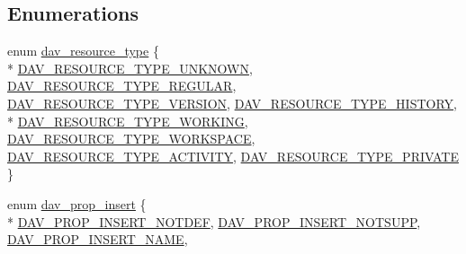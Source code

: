 \subsection*{Enumerations}
\begin{DoxyCompactItemize}
\item 
enum \hyperlink{group__MOD__DAV_gad94695b8d6724b766cfa9f5ec84c0fe2}{dav\+\_\+resource\+\_\+type} \{ \\*
\hyperlink{group__MOD__DAV_ggad94695b8d6724b766cfa9f5ec84c0fe2ac8a224d9b655ee38ad932b97f601fbf2}{D\+A\+V\+\_\+\+R\+E\+S\+O\+U\+R\+C\+E\+\_\+\+T\+Y\+P\+E\+\_\+\+U\+N\+K\+N\+O\+WN}, 
\hyperlink{group__MOD__DAV_ggad94695b8d6724b766cfa9f5ec84c0fe2a567c5375a827c1f808ac4dc5ed1e8e80}{D\+A\+V\+\_\+\+R\+E\+S\+O\+U\+R\+C\+E\+\_\+\+T\+Y\+P\+E\+\_\+\+R\+E\+G\+U\+L\+AR}, 
\hyperlink{group__MOD__DAV_ggad94695b8d6724b766cfa9f5ec84c0fe2a2af72686e7dd0b4e30019abdd5befe12}{D\+A\+V\+\_\+\+R\+E\+S\+O\+U\+R\+C\+E\+\_\+\+T\+Y\+P\+E\+\_\+\+V\+E\+R\+S\+I\+ON}, 
\hyperlink{group__MOD__DAV_ggad94695b8d6724b766cfa9f5ec84c0fe2abe923bf6ee61580d277c32e152cc486c}{D\+A\+V\+\_\+\+R\+E\+S\+O\+U\+R\+C\+E\+\_\+\+T\+Y\+P\+E\+\_\+\+H\+I\+S\+T\+O\+RY}, 
\\*
\hyperlink{group__MOD__DAV_ggad94695b8d6724b766cfa9f5ec84c0fe2a612d793283e8edb2a783c01cec4b7fb0}{D\+A\+V\+\_\+\+R\+E\+S\+O\+U\+R\+C\+E\+\_\+\+T\+Y\+P\+E\+\_\+\+W\+O\+R\+K\+I\+NG}, 
\hyperlink{group__MOD__DAV_ggad94695b8d6724b766cfa9f5ec84c0fe2a53a8b526675a70cec4215fdfbb2f84cd}{D\+A\+V\+\_\+\+R\+E\+S\+O\+U\+R\+C\+E\+\_\+\+T\+Y\+P\+E\+\_\+\+W\+O\+R\+K\+S\+P\+A\+CE}, 
\hyperlink{group__MOD__DAV_ggad94695b8d6724b766cfa9f5ec84c0fe2a962239fd7228f548592f250cd3eecc0f}{D\+A\+V\+\_\+\+R\+E\+S\+O\+U\+R\+C\+E\+\_\+\+T\+Y\+P\+E\+\_\+\+A\+C\+T\+I\+V\+I\+TY}, 
\hyperlink{group__MOD__DAV_ggad94695b8d6724b766cfa9f5ec84c0fe2a28d1cb8f879556fd05593f32658c2894}{D\+A\+V\+\_\+\+R\+E\+S\+O\+U\+R\+C\+E\+\_\+\+T\+Y\+P\+E\+\_\+\+P\+R\+I\+V\+A\+TE}
 \}
\item 
enum \hyperlink{group__MOD__DAV_ga4c0cd73bce52d0eda981ce54973f27af}{dav\+\_\+prop\+\_\+insert} \{ \\*
\hyperlink{group__MOD__DAV_gga4c0cd73bce52d0eda981ce54973f27afad6c4707dbee26a2512e29fe1aac31e34}{D\+A\+V\+\_\+\+P\+R\+O\+P\+\_\+\+I\+N\+S\+E\+R\+T\+\_\+\+N\+O\+T\+D\+EF}, 
\hyperlink{group__MOD__DAV_gga4c0cd73bce52d0eda981ce54973f27afae4995228c2489d111aae3f29f473eee0}{D\+A\+V\+\_\+\+P\+R\+O\+P\+\_\+\+I\+N\+S\+E\+R\+T\+\_\+\+N\+O\+T\+S\+U\+PP}, 
\hyperlink{group__MOD__DAV_gga4c0cd73bce52d0eda981ce54973f27afa331df26b3f9729a36058dd7cf56b0267}{D\+A\+V\+\_\+\+P\+R\+O\+P\+\_\+\+I\+N\+S\+E\+R\+T\+\_\+\+N\+A\+ME}, 

\end{DoxyCompactItemize}

